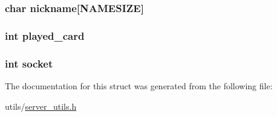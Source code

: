\subsubsection[{\texorpdfstring{nickname}{nickname}}]{\setlength{\rightskip}{0pt plus 5cm}char nickname\mbox{[}{\bf N\+A\+M\+E\+S\+I\+ZE}\mbox{]}}\hypertarget{structplayer_abc1303214a95d3587252a9bdec717b62}{}\label{structplayer_abc1303214a95d3587252a9bdec717b62}
\subsubsection[{\texorpdfstring{played\+\_\+card}{played_card}}]{\setlength{\rightskip}{0pt plus 5cm}int played\+\_\+card}\hypertarget{structplayer_a930188281b101d95d5d8d4c7f25e9467}{}\label{structplayer_a930188281b101d95d5d8d4c7f25e9467}
\subsubsection[{\texorpdfstring{socket}{socket}}]{\setlength{\rightskip}{0pt plus 5cm}int socket}\hypertarget{structplayer_a3666576f6b88007cc7b8f26c7da596c8}{}\label{structplayer_a3666576f6b88007cc7b8f26c7da596c8}


The documentation for this struct was generated from the following file\+:\begin{DoxyCompactItemize}
\item 
utils/\hyperlink{server__utils_8h}{server\+\_\+utils.\+h}\end{DoxyCompactItemize}

